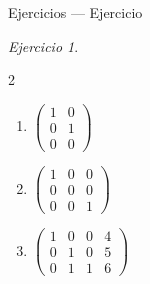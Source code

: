 \documentclass[aspectratio=169,11pt]{beamer}
\theoremstyle{remark}
\newtheorem{Ejer}[definicion]{Ejercicio}
\begin{document}
\begin{frame}[shrink=5]{Ejercicios — Ejercicio}
\begin{Ejer}
\begin{multicols}{2}
\begin{enumerate}[resume]
\item $\begin{pmatrix}1&0\\0&1\\0&0\end{pmatrix}$
\item $\begin{pmatrix}1&0&0\\0&0&0\\0&0&1\end{pmatrix}$
\item $\begin{pmatrix}1&0&0&4\\0&1&0&5\\0&1&1&6\end{pmatrix}$
\end{enumerate}
\end{multicols}
\end{Ejer}
\end{frame}
\end{document}
